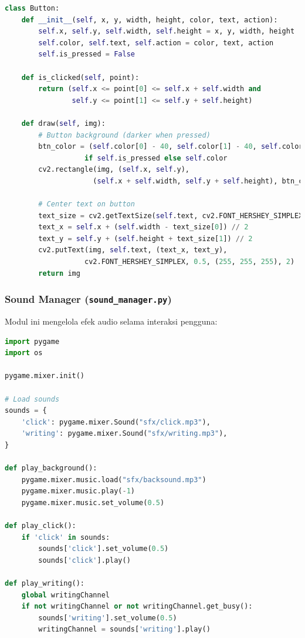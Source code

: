\documentclass[11pt,a4paper]{article}
\begin{document}
\begin{lstlisting}[language=Python, caption=Implementasi UI button system]
class Button:
    def __init__(self, x, y, width, height, color, text, action):
        self.x, self.y, self.width, self.height = x, y, width, height
        self.color, self.text, self.action = color, text, action
        self.is_pressed = False
    
    def is_clicked(self, point):
        return (self.x <= point[0] <= self.x + self.width and 
                self.y <= point[1] <= self.y + self.height)
    
    def draw(self, img):
        # Button background (darker when pressed)
        btn_color = (self.color[0] - 40, self.color[1] - 40, self.color[2] - 40) \
                   if self.is_pressed else self.color
        cv2.rectangle(img, (self.x, self.y), 
                     (self.x + self.width, self.y + self.height), btn_color, cv2.FILLED)
        
        # Center text on button
        text_size = cv2.getTextSize(self.text, cv2.FONT_HERSHEY_SIMPLEX, 0.5, 2)[0]
        text_x = self.x + (self.width - text_size[0]) // 2
        text_y = self.y + (self.height + text_size[1]) // 2
        cv2.putText(img, self.text, (text_x, text_y), 
                   cv2.FONT_HERSHEY_SIMPLEX, 0.5, (255, 255, 255), 2)
        return img
\end{lstlisting}

\subsubsection{Sound Manager (\texttt{sound\_manager.py})}
Modul ini mengelola efek audio selama interaksi pengguna:

\begin{lstlisting}[language=Python, caption=Implementasi sound management]
import pygame
import os

pygame.mixer.init()

# Load sounds
sounds = {
    'click': pygame.mixer.Sound("sfx/click.mp3"),
    'writing': pygame.mixer.Sound("sfx/writing.mp3"),
}

def play_background():
    pygame.mixer.music.load("sfx/backsound.mp3")
    pygame.mixer.music.play(-1)
    pygame.mixer.music.set_volume(0.5)

def play_click():
    if 'click' in sounds:
        sounds['click'].set_volume(0.5)
        sounds['click'].play()

def play_writing():
    global writingChannel
    if not writingChannel or not writingChannel.get_busy():
        sounds['writing'].set_volume(0.5)
        writingChannel = sounds['writing'].play()
\end{lstlisting}
\end{document}

